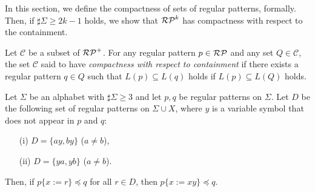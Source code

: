 
In this section, we define the compactness of sets of regular patterns, formally.
Then, if $\sharp\Sigma \ge 2k-1$ holds, 
we show that 
$\mathcal{RP}^{k}$ has compactness with respect to the containment.

\begin{dfn}\label{def:compactness}
Let $\mathcal{C}$ be a subset of $\mathcal{RP}^{+}$. 
For any regular pattern $p \in \mathcal{RP}$ and any set $Q \in \mathcal{C}$,
the set $\mathcal{C}$ said to have {\it compactness with respect to containment}
if there exists a regular pattern $q \in Q$ such that $L(p) \subseteq L(q)$ holds if $L(p) \subseteq L(Q)$ holds.
\end{dfn}

\begin{lem}\label{lem:twovariables}
Let $\Sigma$ be an alphabet with $\sharp\Sigma \ge 3$ and let $p,q$ be regular patterns on $\Sigma$.
Let $D$ be the following set of regular patterns on $\Sigma\cup X$, where $y$ is a variable symbol that does not appear in $p$ and $q$:
\begin{enumerate}
\item[{\rm (i)}] $D=\{ ay, by \}$ ($a \not= b$),
\item[{\rm (ii)}] $D=\{ ya, yb \}$ ($a \not= b$).
\end{enumerate}
Then, if $p \{ x := r \} \preceq q$ for all $r \in D$, then $p \{ x := xy \} \preceq q$.
\end{lem}

